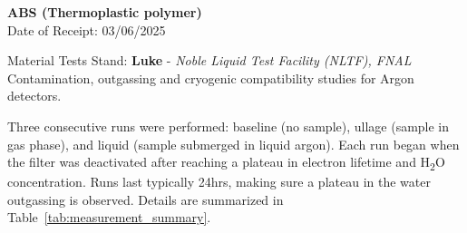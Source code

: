 \documentclass[12pt]{article}
\begin{document}
\begin{center}
    \LARGE \textbf{ ABS (Thermoplastic polymer) } \\
    \large Date of Receipt: 03/06/2025
\end{center}

\begin{center}
    \large Material Tests Stand: \textbf{Luke} - \textit{Noble Liquid Test Facility (NLTF), FNAL} \\
    \small Contamination, outgassing and cryogenic compatibility studies for Argon detectors.
\end{center}


\begin{table}[H]
    \centering
    \caption*{\textbf{Sample Information}}
\end{table}

Three consecutive runs were performed: baseline (no sample), ullage (sample in gas phase), and liquid (sample submerged in liquid argon). Each run began when the filter was deactivated after reaching a plateau in electron lifetime and H\textsubscript{2}O concentration. Runs last typically 24hrs, making sure a plateau in the water outgassing is observed. Details are summarized in Table~\ref{tab:measurement_summary}.
\end{document}
